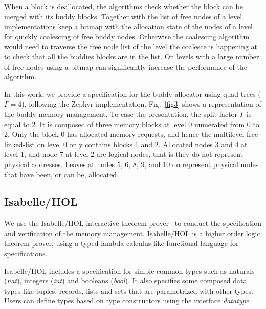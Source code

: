 When a block is deallocated, the algorithms check whether the block can be merged with its buddy blocks. Together with the list of free nodes of a level, implementations keep a bitmap with the allocation state of the nodes of a level for quickly coalescing of free buddy nodes. Otherwise the coalescing algorithm would need to traverse the free node list of the level the coalesce is happening at to check that all the buddies blocks are in the list. On levels with a large number of free nodes using a bitmap can significantly increase the performance of the algorithm.

In this work, we provide a specification for the buddy allocator using quad-trees ($\Gamma = 4$), following the Zephyr implementation. Fig.~\ref{fig3} shows a representation of the buddy memory management. To ease the presentation, the split factor $\Gamma$ is equal to 2. It is composed of three memory blocks at level 0 numerated from 0 to 2. Only the block 0 has allocated memory requests, and hence the multilevel free linked-list on level 0 only contains blocks 1 and 2. Allocated nodes 3 and 4 at level 1, and node 7 at level 2 are logical nodes, that is they do not represent physical addresses. Leaves at nodes 5, 6, 8, 9, and 10 do represent physical nodes that have been, or can be, allocated.



\subsection{Isabelle/HOL}
We use the Isabelle/HOL interactive theorem prover~\cite{reg_Isabelle/HOL} to conduct the specification and verification of the memory management. Isabelle/HOL is a higher order logic theorem prover, using a typed lambda calculus-like functional language for specifications.

Isabelle/HOL includes a specification for simple common types such as naturals (\emph{nat}), integers (\emph{int}) and booleans (\emph{bool}). It also specifies some composed data types like tuples, records, lists and sets that are parametrized with other types. Users can define types based on type constructors using the interface \emph{datatype}.

